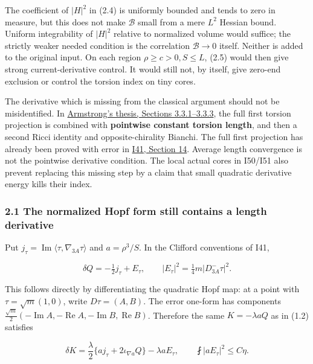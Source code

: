 \documentclass[
  10pt,
]{article}
\begin{document}
The coefficient of \(|H|^2\) in (2.4) is uniformly bounded and tends to
zero in measure, but this does not make \(\mathcal B\) small from a mere
\(L^2\) Hessian bound. Uniform integrability of \(|H|^2\) relative to
normalized volume would suffice; the strictly weaker needed condition is
the correlation \(\mathcal B\to0\) itself. Neither is added to the
original input. On each region \(\rho\ge c>0,S\le L\), (2.5) would then
give strong current-derivative control. It would still not, by itself,
give zero-end exclusion or control the torsion index on tiny cores.

The derivative which is missing from the classical argument should not
be misidentified. In
\href{https://johnarmstrongmaths.com/publications/resources/thesis.pdf}{Armstrong's
thesis, Sections 3.3.1--3.3.3}, the full first torsion projection is
combined with \textbf{pointwise constant torsion length}, and then a
second Ricci identity and opposite-chirality Bianchi. The full first
projection has already been proved with error in
\href{20260927_conformal_separation_and_zero_end.md}{I41, Section 14}.
Average length convergence is not the pointwise derivative condition.
The local actual cores in I50/I51 also prevent replacing this missing
step by a claim that small quadratic derivative energy kills their
index.

\hypertarget{the-normalized-hopf-form-still-contains-a-length-derivative}{%
\subsubsection{2.1 The normalized Hopf form still contains a length
derivative}\label{the-normalized-hopf-form-still-contains-a-length-derivative}}

Put \(j_\tau=\operatorname{Im}\langle\tau,\nabla_{3A}\tau\rangle\) and
\(a=\rho^3/S\). In the Clifford conventions of I41,

\[
 \delta Q=-\tfrac12 j_\tau+E_\tau,\qquad
 |E_\tau|^2=\tfrac14 m|D^-_{3A}\tau|^2.
 \tag{2.8}
\]

This follows directly by differentiating the quadratic Hopf map: at a
point with \(\tau=\sqrt m(1,0)\), write \(D\tau=(A,B)\). The error
one-form has components
\(\frac{\sqrt m}{2}(-\operatorname{Im}A,-\operatorname{Re}A, -\operatorname{Im}B,\operatorname{Re}B)\).
Therefore the same \(K=-\lambda aQ\) as in (1.2) satisfies

\[
 \delta K=\frac{\lambda}{2}
       \{a j_\tau+2\iota_{\nabla a}Q\}-\lambda aE_\tau,
 \qquad \fint |aE_\tau|^2\le C\eta.
 \tag{2.9}
\]
\end{document}

